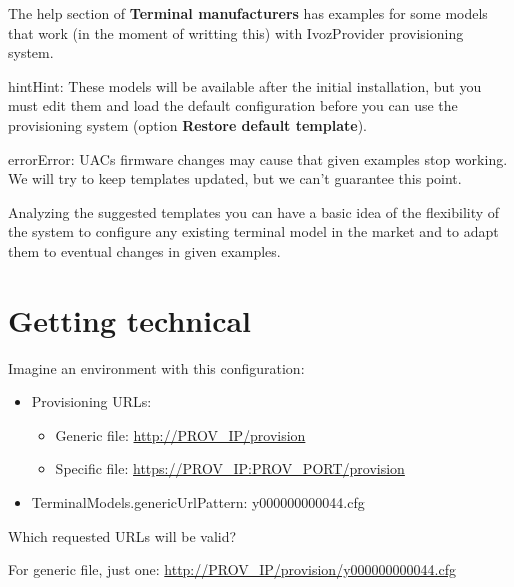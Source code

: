 \documentclass[letterpaper,10pt,english]{sphinxmanual}
\begin{document}
The help section of \textbf{Terminal manufacturers} has examples for some models
that work (in the moment of writting this) with IvozProvider provisioning system.

\begin{notice}{hint}{Hint:}
These models will be available after the initial installation, but
you must edit them and load the default configuration before
you can use the provisioning system (option \textbf{Restore default template}).
\end{notice}

\begin{notice}{error}{Error:}
UACs firmware changes may cause that given examples stop working. We
will try to keep templates updated, but we can't guarantee this point.
\end{notice}

Analyzing the suggested templates you can have a basic idea of the flexibility of
the system to configure any existing terminal model in the market and to adapt
them to eventual changes in given examples.


\section{Getting technical}
\label{provisioning/index:getting-technical}
Imagine an environment with this configuration:
\begin{itemize}
\item {} 
Provisioning URLs:
\begin{itemize}
\item {} 
Generic file: \url{http://PROV\_IP/provision}

\item {} 
Specific file: \url{https://PROV\_IP:PROV\_PORT/provision}

\end{itemize}

\item {} 
TerminalModels.genericUrlPattern: y000000000044.cfg

\end{itemize}

Which requested URLs will be valid?

For generic file, just one: \url{http://PROV\_IP/provision/y000000000044.cfg}
\end{document}
